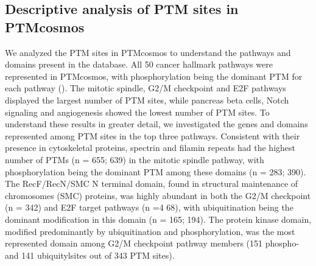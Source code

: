 \subsection{Descriptive analysis of PTM sites in PTMcosmos}
We analyzed the PTM sites in PTMcosmos to understand the pathways and domains present in the database. All 50 cancer hallmark pathways were represented in PTMcosmos, with phosphorylation being the dominant PTM for each pathway (). The mitotic spindle, G2/M checkpoint and E2F pathways displayed the largest number of PTM sites, while pancreas beta cells, Notch signaling and angiogenesis showed the lowest number of PTM sites. To understand these results in greater detail, we investigated the genes and domains represented among PTM sites in the top three pathways. Consistent with their presence in cytoskeletal proteins, spectrin and filamin repeats had the highest number of PTMs (n = 655; 639) in the mitotic spindle pathway, with phosphorylation being the dominant PTM among these domains (n = 283; 390). The RecF/RecN/SMC N terminal domain, found in structural maintenance of chromosomes (SMC) proteins, was highly abundant in both the G2/M checkpoint (n = 342) and E2F target pathways (n =4 68), with ubiquitination being the dominant modification in this domain (n = 165; 194). The protein kinase domain, modified predominantly by ubiquitination and phosphorylation, was the most represented domain among G2/M checkpoint pathway members (151 phospho- and 141 ubiquitylsites out of 343 PTM sites).

